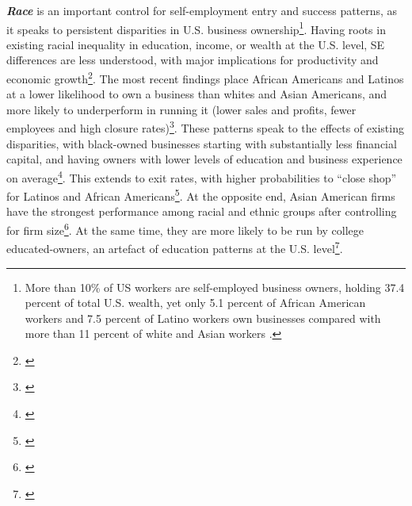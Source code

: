 \textbf{\textit{Race}} is an important control for self-employment entry and success patterns, as it speaks to persistent disparities in U.S. business ownership\footnote{ More than 10\% of US workers are self-employed business owners, holding 37.4 percent of total U.S. wealth, yet only 5.1 percent of African American workers and 7.5 percent of Latino workers own businesses compared with more than 11 percent of white and Asian workers \cite{FairlieRobb2008}.}. Having roots in existing racial inequality in education, income, or wealth at the U.S. level, SE differences are less understood, with major implications for productivity and economic growth\footnote{\cite{ReynoldsWhite1997}}. The most recent findings place African Americans and Latinos at a lower likelihood to own a business than whites and Asian Americans, and more likely to underperform in running it (lower sales and profits, fewer employees and high closure rates)\footnote{\cite{FairlieRobb2008}}. These patterns speak to the effects of existing disparities, with black-owned businesses starting with substantially less financial capital, and having owners with lower levels of education and business experience on average\footnote{\cite{FairlieRobb2008}}. This extends to exit rates, with higher probabilities to ``close shop'' for Latinos and African Americans\footnote{\cite{FairlieRobb2008}}. At the opposite end, Asian American firms have the strongest performance among racial and ethnic groups after controlling for firm size\footnote{\cite{FairlieRobb2008}}. At the same time, they are more likely to be run by college educated-owners, an artefact of education patterns at the U.S. level\footnote{\cite{FairlieRobb2008}}.

